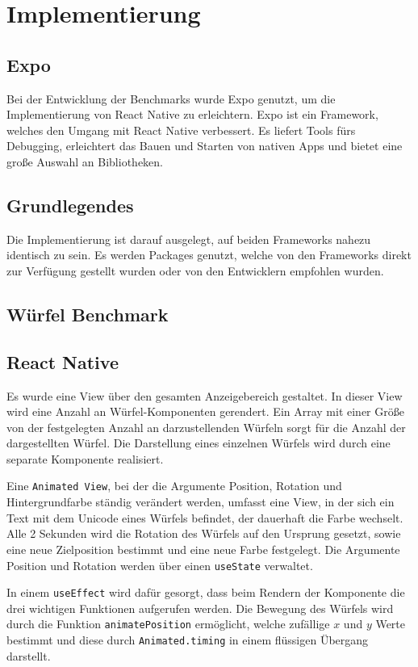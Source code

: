 \section{Implementierung}
\subsection{Expo}

Bei der Entwicklung der Benchmarks wurde Expo genutzt, um die Implementierung von React Native zu erleichtern. Expo ist ein Framework, welches den Umgang mit React Native verbessert. Es liefert Tools fürs Debugging, erleichtert das Bauen und Starten von nativen Apps und bietet eine große Auswahl an Bibliotheken.

\subsection{Grundlegendes}

Die Implementierung ist darauf ausgelegt, auf beiden Frameworks nahezu identisch zu sein. Es werden Packages genutzt, welche von den Frameworks direkt zur Verfügung gestellt wurden oder von den Entwicklern empfohlen wurden.

\subsection{Würfel Benchmark}

\subsection*{React Native}

Es wurde eine View über den gesamten Anzeigebereich gestaltet. In dieser View wird eine Anzahl an Würfel-Komponenten gerendert. Ein Array mit einer Größe von der festgelegten Anzahl an darzustellenden Würfeln sorgt für die Anzahl der dargestellten Würfel. Die Darstellung eines einzelnen Würfels wird durch eine separate Komponente realisiert. 

Eine \texttt{Animated View}, bei der die Argumente Position, Rotation und Hintergrundfarbe ständig verändert werden, umfasst eine View, in der sich ein Text mit dem Unicode eines Würfels befindet, der dauerhaft die Farbe wechselt. Alle 2 Sekunden wird die Rotation des Würfels auf den Ursprung gesetzt, sowie eine neue Zielposition bestimmt und eine neue Farbe festgelegt. Die Argumente Position und Rotation werden über einen \texttt{useState} verwaltet. 

In einem \texttt{useEffect} wird dafür gesorgt, dass beim Rendern der Komponente die drei wichtigen Funktionen aufgerufen werden. Die Bewegung des Würfels wird durch die Funktion \texttt{animatePosition} ermöglicht, welche zufällige \(x\) und \(y\) Werte bestimmt und diese durch \texttt{Animated.timing} in einem flüssigen Übergang darstellt. 

